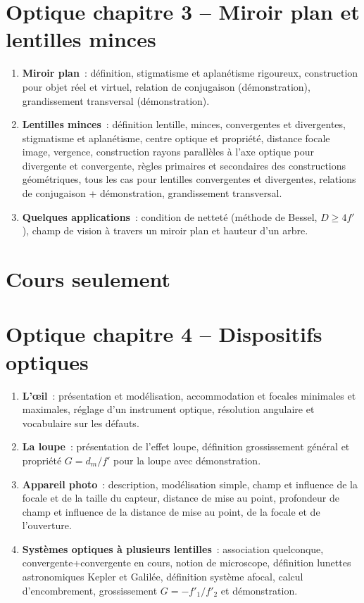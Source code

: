 \documentclass[a4paper, 12pt, final, garamond]{book}
\begin{document}
\section*{Optique chapitre 3 -- Miroir plan et lentilles minces}
\begin{enumerate}[label=\Roman*]
    \item \textbf{Miroir plan}~: définition, stigmatisme et aplanétisme
        rigoureux, construction pour objet réel et virtuel, relation de
        conjugaison (démonstration), grandissement transversal (démonstration).
    \item \textbf{Lentilles minces}~: définition lentille, minces, convergentes
        et divergentes, stigmatisme et aplanétisme, centre optique et propriété,
        distance focale image, vergence, construction rayons parallèles à l'axe
        optique pour divergente et convergente, règles primaires et secondaires
        des constructions géométriques, tous les cas pour lentilles convergentes
        et divergentes, relations de conjugaison + démonstration, grandissement
        transversal.
    \item \textbf{Quelques applications}~: condition de netteté (méthode de
        Bessel, $D \geq 4f'$), champ de vision à travers un miroir plan et
        hauteur d'un arbre.
\end{enumerate}

\section{Cours seulement}

\section*{Optique chapitre 4 -- Dispositifs optiques}
\begin{enumerate}[label=\Roman*]
    \item \textbf{L'œil}~: présentation et modélisation, accommodation et
        focales minimales et maximales, réglage d'un instrument optique,
        résolution angulaire et vocabulaire sur les défauts.
    \item \textbf{La loupe}~: présentation de l'effet loupe, définition
        grossissement général et propriété $G = d_m/f'$ pour la loupe avec
        démonstration.
    \item \textbf{Appareil photo}~: description, modélisation simple, champ et
        influence de la focale et de la taille du capteur, distance de mise au
        point, profondeur de champ et influence de la distance de mise au point,
        de la focale et de l'ouverture.
    \item \textbf{Systèmes optiques à plusieurs lentilles}~: association
        quelconque, convergente+convergente en cours, notion de microscope,
        définition lunettes astronomiques Kepler et Galilée, définition système
        afocal, calcul d'encombrement, grossissement $G=-f'_1/f'_2$ et
        démonstration.
\end{enumerate}
\end{document}
